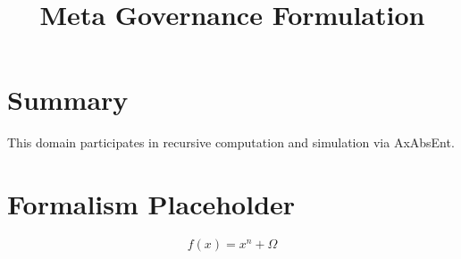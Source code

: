 \documentclass[12pt]{article}
\title{\textbf{Meta Governance Formulation}}
\begin{document}
\maketitle

\section*{Summary}
This domain participates in recursive computation and simulation via AxAbsEnt.

\section*{Formalism Placeholder}
\[
f(x) = x^n + \Omega
\]
\end{document}
